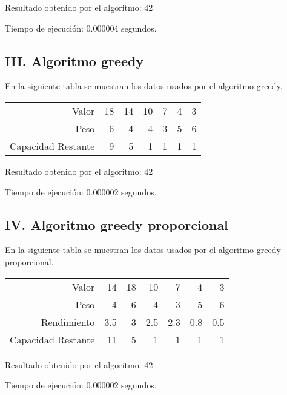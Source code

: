 \documentclass{article}
\begin{document}
Resultado obtenido por el algoritmo: 42

Tiempo de ejecución: 0.000004 segundos.
\subsection*{III. Algoritmo greedy}
En la siguiente tabla se muestran los datos usados por el algoritmo greedy.
\begin{table}[h]
\centering
\begin{tabular}{r|rrrrrr}
Valor&18&14&10&7&4&3\\
Peso&6&4&4&3&5&6\\
\hline Capacidad Restante&9&5&1&1&1&1\\
\end{tabular}
\end{table}

Resultado obtenido por el algoritmo: 42

Tiempo de ejecución: 0.000002 segundos.
\subsection*{IV. Algoritmo greedy proporcional}
En la siguiente tabla se muestran los datos usados por el algoritmo greedy proporcional.
\begin{table}[h]
\centering
\begin{tabular}{r|rrrrrr}
Valor&14&18&10&7&4&3\\
Peso&4&6&4&3&5&6\\
Rendimiento&3.5&3&2.5&2.3&0.8&0.5\\
\hline Capacidad Restante&11&5&1&1&1&1\\
\end{tabular}
\end{table}

Resultado obtenido por el algoritmo: 42

Tiempo de ejecución: 0.000002 segundos.
\end{document}
